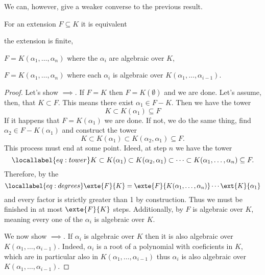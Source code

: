 \documentclass[12pt,oneside]{book}
\begin{document}
We can, however, give a weaker converse to the previous result.
{\def\currentprefix{prop:characterisation of finite extensions}
\begin{proposition}\label{prop:characterisation of finite extensions}
	For an extension \( F \subseteq K \) it is equivalent
	\begin{points}
	\item {} the extension is finite,
	\item {} \( F = K(\alpha_1, \dots, \alpha_n) \) where the \( \alpha_i \)
		are algebraic over \( K \),
	\item {} \( F = K(\alpha_1, \dots, \alpha_n) \) where each \( \alpha_i \)
		is algebraic over \( K(\alpha_1, \dots, \alpha_{i-1}) \).
	\end{points}
\end{proposition}
\begin{proof}
	Let's show \( \implies \). If \( F = K \) then \( F =
	K(\emptyset) \) and we are done. Let's assume, then, that \( K \subset F \). This means
	there exist \( \alpha_1 \in F-K \). Then we have the tower 
	\begin{equation*}
		K \subset K(\alpha_1) \subseteq F
	\end{equation*}
	If it happens that \( F = K(\alpha_1) \) we are done. If not, we do the same thing, find
	\( \alpha_2 \in F - K(\alpha_1) \) and construct the tower
	\begin{equation*}
		K \subset K(\alpha_1) \subset K(\alpha_2, \alpha_1) \subseteq F.
	\end{equation*}
	This process must end at some point. Ideed, at step \( n \) we have the tower
	\begin{equation}\locallabel{eq:tower}
		K \subset K(\alpha_1) \subset K(\alpha_2, \alpha_1) \subset \cdots \subset K(\alpha_1,
		\dots, \alpha_n) \subseteq F.
	\end{equation}
	Therefore, by the 
	\begin{equation}\locallabel{eq:degrees}
		\exte{F}{K} = \exte{F}{K(\alpha_1, \dots, \alpha_n)} \cdots \ext{K}{\alpha_1}
	\end{equation}
	and every factor is strictly greater than 1 by construction. Thus we must be finished in at
	most \( \exte{F}{K} \) steps. Additionally, by  \( F \) is algebraic over \( K \), meaning every one of the \( \alpha_i \) is
	algebraic over \( K \).
	
	We now show \( \implies \). If \( \alpha_i \) is algebraic
	over \( K \) then it is also algebraic over \( K(\alpha_1, \dots, \alpha_{i-1}) \).
	Indeed, \( \alpha_i \) is a root of a polynomial with coeficients in \( K \), which are
	in particular also in	\( K(\alpha_1, \dots, \alpha_{i-1}) \) thus \( \alpha_i \) is also
	algebraic over \( K(\alpha_1, \dots, \alpha_{i-1}) \).


\end{proof}}
\end{document}

